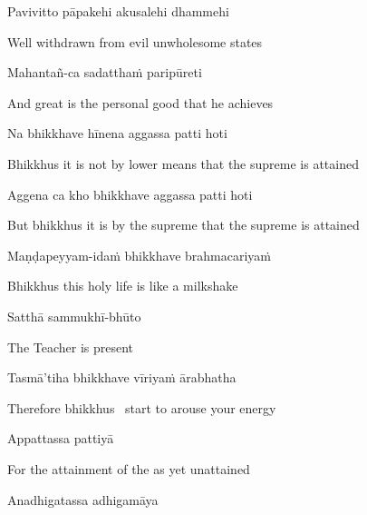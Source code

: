 Pavivitto pāpakehi akusalehi dhammehi

\begin{cprenglish}
  Well withdrawn from evil
  unwholesome states
\end{cprenglish}

Mahantañ-ca sadatthaṁ paripūreti

\begin{cprenglish}
  And great is the personal good that he achieves
\end{cprenglish}

Na bhikkhave hīnena aggassa patti hoti

\begin{cprenglish}
  Bhikkhus it is not by lower means that the supreme is attained
\end{cprenglish}

Aggena ca kho bhikkhave aggassa patti hoti

\begin{cprenglish}
  But bhikkhus it is by the supreme that the supreme is attained
\end{cprenglish}

Maṇḍapeyyam-idaṁ bhikkhave brahmacariyaṁ

\begin{cprenglish}
  Bhikkhus this holy life is like a milkshake
\end{cprenglish}

Satthā sammukhī-bhūto

\begin{cprenglish}
  The Teacher is present
\end{cprenglish}

Tasmā’tiha bhikkhave vīriyaṁ ārabhatha

\begin{cprenglish}
  Therefore bhikkhus \breathmark\ start to arouse your energy
\end{cprenglish}

Appattassa pattiyā

\begin{cprenglish}
  For the attainment of the as yet unattained
\end{cprenglish}

Anadhigatassa adhigamāya

